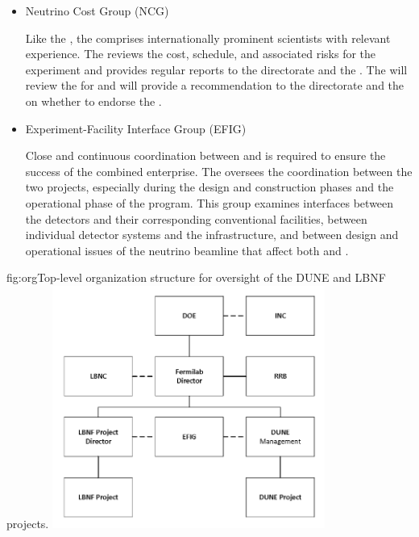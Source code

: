\begin{itemize}
Upon request from the  director, the  may use other  and  groups to scrutinize more detailed reports and evaluations.  

\item Neutrino Cost Group (NCG)

Like the , the  comprises internationally prominent scientists with relevant experience.  The  reviews the cost, schedule, and associated risks for the  experiment and provides regular reports to the  directorate and the .  The  will review the  for  and will provide a recommendation to the  directorate and the  on whether to endorse the .


\item Experiment-Facility Interface Group (EFIG)

Close and continuous coordination between  and  is required to ensure the success of the combined enterprise. The   oversees the coordination between the two projects, especially during the design and construction phases and the operational phase of the program. %
This group examines interfaces between the detectors and their corresponding conventional facilities, between individual detector systems and the  infrastructure, and between design and operational issues of the  neutrino beamline that affect both  and .  

\end{itemize}

\begin{dunefigure}	
{fig:org}{Top-level organization structure for oversight of the DUNE and LBNF projects.}
\includegraphics[width=0.67\textwidth]{graphics/lbnf_dune_org.png}  
\end{dunefigure}

